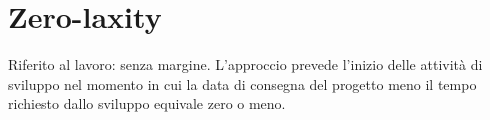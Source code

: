 \documentclass[11pt]{article}
\begin{document}
	\section{\LARGE Zero-laxity}
	\label{sec:zerolaxity}
	Riferito al lavoro: senza margine. L'approccio prevede l'inizio delle attività di sviluppo nel momento in cui la data di consegna del progetto meno il tempo richiesto dallo sviluppo equivale zero o meno. 
\end{document}
